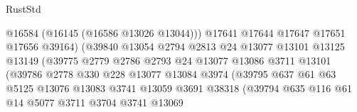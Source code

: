 \begin{lexlean}{RustStd}
\begin{coremodule}
                                        @16584
                                        (@16145 (@16586 @13026 @13044)))
                                      @17641
                                      @17644
                                      @17647
                                      @17651
                                      @17656
                                      @39164)
                                    (@39840
                                      @13054
                                      @2794
                                      @2813
                                      @24
                                      @13077
                                      @13101
                                      @13125
                                      @13149
                                      (@39775
                                        @2779
                                        @2786
                                        @2793
                                        @24
                                        @13077
                                        @13086
                                        @3711
                                        @13101
                                        (@39786
                                          @2778
                                          @330
                                          @228
                                          @13077
                                          @13084
                                          @3974
                                          (@39795
                                            @637
                                            @61
                                            @63
                                            @5125
                                            @13076
                                            @13083
                                            @3741
                                            @13059
                                            @3691
                                            @38318
                                            (@39794
                                              @635
                                              @116
                                              @61
                                              @14
                                              @5077
                                              @3711
                                              @3704
                                              @3741
                                              @13069

\end{coremodule}
\end{lexlean}
